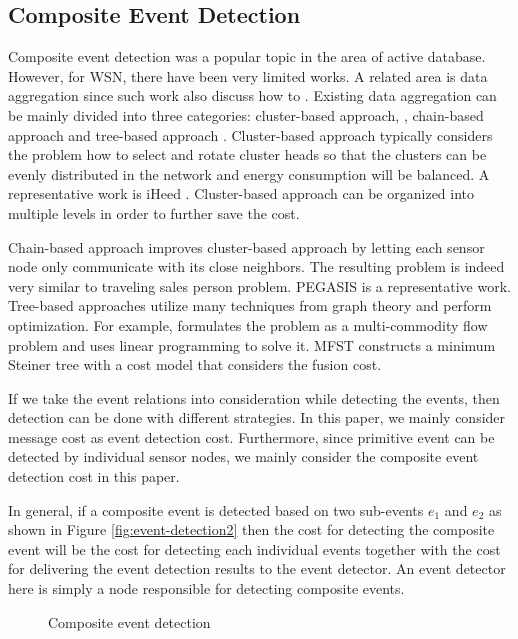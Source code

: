 \subsection{Composite Event Detection}
Composite event detection was a popular topic in the area of active database. However, for WSN, there have been very limited works. A related area is data aggregation since such work also discuss how to . Existing data aggregation can be mainly divided into three categories: cluster-based approach, \cite{leach, iheed}, chain-based approach \cite{pegasis} and tree-based approach \cite{mfst, dctc}. Cluster-based approach typically considers the problem how to select and rotate cluster heads so that the clusters can be evenly distributed in the network  and energy consumption will be balanced. A representative work is iHeed \cite{iheed}. Cluster-based approach can be organized into multiple levels in order to further save the cost.

Chain-based approach improves cluster-based approach by letting each sensor node only communicate with its close neighbors. The resulting problem is indeed very similar to traveling sales person problem. PEGASIS \cite{pegasis} is a representative work. Tree-based approaches utilize many techniques from graph theory and perform optimization. For example, \cite{xue:lp} formulates the problem as a multi-commodity flow problem and uses linear programming to solve it.  MFST \cite{mfst} constructs a minimum Steiner tree with a cost model that considers the fusion cost.

If we take the event relations into consideration while detecting the events, then detection can be done with different strategies. In this paper, we mainly consider message cost as event detection cost. Furthermore, since primitive event can be detected by individual sensor nodes, we mainly consider the composite event detection cost in this paper.

In general, if a composite event is detected based on two sub-events \(e_1\) and \(e_2\) as shown in Figure \ref{fig:event-detection2} then the cost for detecting the composite event will be the cost for detecting each individual events together with the cost for delivering the event detection results to the event detector. An event detector here is simply a node responsible for detecting composite events.

\begin{figure}
\centering
{}
\caption{Composite event detection}
\label{fig:event-detection}
\end{figure}

